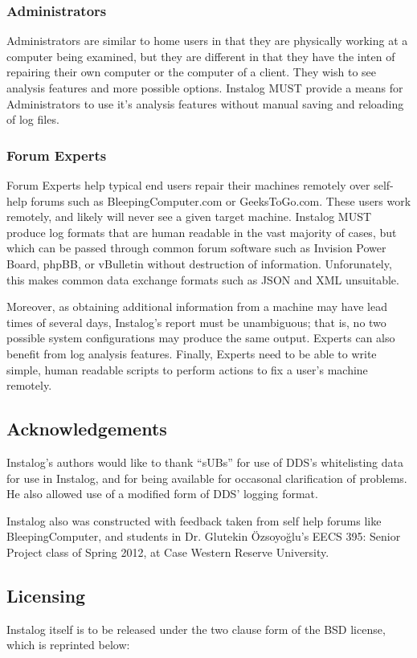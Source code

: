 \documentclass[letterpaper,12pt]{article}
\begin{document}
\subsubsection{Administrators}
Administrators are similar to home users in that they are physically working at
a computer being examined, but they are different in that they have the inten of
repairing their own computer or the computer of a client. They wish to see
analysis features and more possible options. Instalog MUST provide a means for
Administrators to use it's analysis features without manual saving and reloading
of log files.

\subsubsection{Forum Experts}
Forum Experts help typical end users repair their machines remotely over
self-help forums such as BleepingComputer.com or GeeksToGo.com.
These users work remotely, and likely will never see a given target
machine.
Instalog MUST produce log formats that are human readable in the vast majority
of cases, but which can be passed through common forum software such as Invision
Power Board, phpBB, or vBulletin without destruction of information.
Unforunately, this makes common data exchange formats such as JSON and XML
unsuitable. 

Moreover, as obtaining additional information from a machine may
have lead times of several days, Instalog's report must be unambiguous; that is,
no two possible system configurations may produce the same output. Experts can
also benefit from log analysis features. Finally, Experts need to be able to
write simple, human readable scripts to perform actions to fix a user's machine
remotely.

\subsection{Acknowledgements}
Instalog's authors would like to thank ``sUBs'' for use of DDS's whitelisting
data for use in Instalog, and for being available for occasonal clarification
of problems. He also allowed use of a modified form of DDS' logging format.

Instalog also was constructed with feedback taken from self help forums like
BleepingComputer, and students in Dr. Glutekin Özsoyoğlu's EECS 395: Senior
Project class of Spring 2012, at Case Western Reserve University.

\subsection{Licensing}
Instalog itself is to be released under the two clause form of the BSD license,
which is reprinted below:
\end{document}
